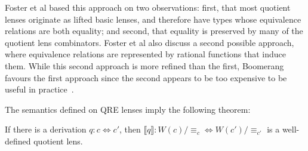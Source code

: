\documentclass[acmsmall,review,anonymous]{acmart}\settopmatter{printfolios=true,printccs=false,printacmref=false}
\newcommand{\eqrel}[1]{\ensuremath{\equiv_{#1}}}
\begin{document}
Foster et al based this approach on two observations: first, that most quotient
lenses originate as lifted basic lenses, and therefore have types whose
equivalence relations are both equality; and second, that equality is preserved
by many of the quotient lens combinators. Foster et al also discuss a second
possible approach, where equivalence relations are represented by rational
functions that induce them. While this second approach is more refined than the
first, Boomerang favours the first approach since the second appears to be too
expensive to be useful in practice~\cite{quotientlenses}.

The semantics defined on QRE lenses imply the following theorem:
\begin{theorem}
If there is a derivation $q : c \Leftrightarrow c'$, then $\llbracket q
\rrbracket : W(c)/{\eqrel{c}} \Leftrightarrow W(c')/{\eqrel{c'}}$ is a
well-defined quotient lens.
\end{theorem}
\end{document}
